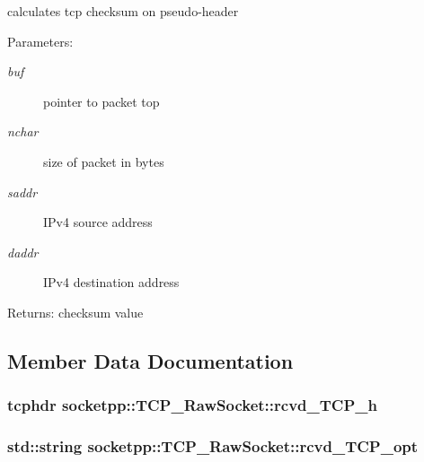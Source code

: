 calculates tcp checksum on pseudo-header 

\begin{Desc}
\item[Parameters:]
\begin{description}
\item[{\em buf}]pointer to packet top \item[{\em nchar}]size of packet in bytes \item[{\em saddr}]IPv4 source address \item[{\em daddr}]IPv4 destination address \end{description}
\end{Desc}
\begin{Desc}
\item[Returns:]checksum value \end{Desc}


\subsection{Member Data Documentation}
\hypertarget{classsocketpp_1_1TCP__RawSocket_12b2d2f00d02c377301fc10e1209a8b8}{
\subsubsection[{rcvd\_\-TCP\_\-h}]{\setlength{\rightskip}{0pt plus 5cm}tcphdr {\bf socketpp::TCP\_\-RawSocket::rcvd\_\-TCP\_\-h}}}
\label{classsocketpp_1_1TCP__RawSocket_12b2d2f00d02c377301fc10e1209a8b8}


\hypertarget{classsocketpp_1_1TCP__RawSocket_b7bddcb31a7a310bcf61fcc474ded465}{
\subsubsection[{rcvd\_\-TCP\_\-opt}]{\setlength{\rightskip}{0pt plus 5cm}std::string {\bf socketpp::TCP\_\-RawSocket::rcvd\_\-TCP\_\-opt}}}
\label{classsocketpp_1_1TCP__RawSocket_b7bddcb31a7a310bcf61fcc474ded465}


